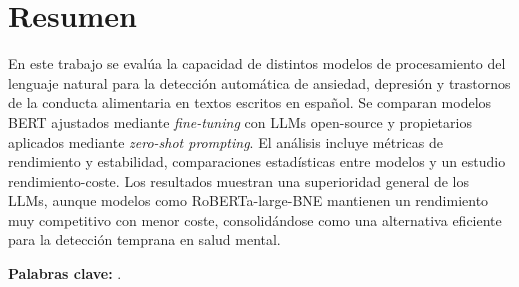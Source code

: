 %
%
%
% 
%
%
%
%

\chapter*{Resumen}
\label{cha:resumen}


En este trabajo se evalúa la capacidad de distintos modelos de procesamiento del lenguaje natural para la detección automática de ansiedad, depresión y trastornos de la conducta alimentaria en textos escritos en español. Se comparan modelos BERT ajustados mediante \textit{fine-tuning} con LLMs open-source y propietarios aplicados mediante \textit{zero-shot prompting}. El análisis incluye métricas de rendimiento y estabilidad, comparaciones estadísticas entre modelos y un estudio rendimiento-coste. Los resultados muestran una superioridad general de los LLMs, aunque modelos como RoBERTa-large-BNE mantienen un rendimiento muy competitivo con menor coste, consolidándose como una alternativa eficiente para la detección temprana en salud mental.

\textbf{Palabras clave:} \myThesisKeywords.



